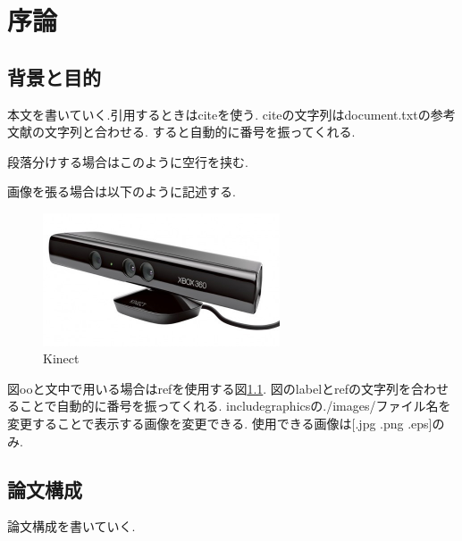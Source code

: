 \chapter{序論}\label{abst}
\section{背景と目的}
本文を書いていく.引用するときはciteを使う\cite{cite_1}.
citeの文字列はdocument.txtの参考文献の文字列と合わせる.
すると自動的に番号を振ってくれる.

段落分けする場合はこのように空行を挟む.

画像を張る場合は以下のように記述する.

\begin{figure}[htbp]
  \begin{center}
    \includegraphics[clip,width=7.0cm]{./images/Kinect.jpg}
    \caption{Kinect}
    \label{fig:Kinect}
  \end{center}
\end{figure}

図ooと文中で用いる場合はrefを使用する図\ref{fig:Kinect}.
図のlabelとrefの文字列を合わせることで自動的に番号を振ってくれる.
includegraphicsの./images/ファイル名を変更することで表示する画像を変更できる.
使用できる画像は[.jpg .png .eps]のみ.

\section{論文構成}
論文構成を書いていく.